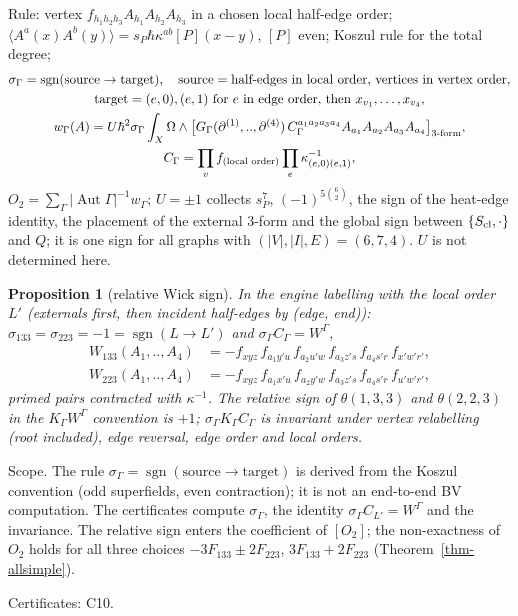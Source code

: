 \documentclass[10pt,a4paper]{article}
\numberwithin{equation}{section}
\newtheorem{proposition}[theorem]{Proposition}
\theoremstyle{definition}
\theoremstyle{remark}
\newcommand{\sgn}{\operatorname{sgn}}
\newcommand{\Aut}{\operatorname{Aut}}
\newcommand{\cert}[1]{\par\noindent\textup{Certificates: #1.}\par}
\begin{document}
Rule: vertex $f_{h_1h_2h_3}A_{h_1}A_{h_2}A_{h_3}$ in a chosen local half-edge order; $\langle A^a(x)A^b(y)\rangle=s_P\hbar\kappa^{ab}[P](x-y)$, $[P]$ even; Koszul rule for the total degree;
\begin{gather}
\sigma_\Gamma=\sgn(\text{source}\to\text{target}),\quad\text{source}=\text{half-edges in local order, vertices in vertex order},\notag\\
\text{target}=(e,0),(e,1)\ \text{for }e\text{ in edge order, then }x_{v_1},\dots,x_{v_4},\notag\\
w_\Gamma(A)=U\hbar^2\sigma_\Gamma\int_X\Omega\wedge\big[G_\Gamma(\partial^{(1)},..,\partial^{(4)})\,C_\Gamma^{a_1a_2a_3a_4}A_{a_1}A_{a_2}A_{a_3}A_{a_4}\big]_{3\text{-form}},\\
C_\Gamma=\prod_vf_{(\text{local order})}\prod_e\kappa^{-1}_{(e,0)(e,1)},
\end{gather}
$O_2=\sum_\Gamma|\Aut\Gamma|^{-1}w_\Gamma$; $U=\pm1$ collects $s_P^7$, $(-1)^{5\binom62}$, the sign of the heat-edge identity, the placement of the external $3$-form and the global sign between $\{S_{\rm cl},\cdot\}$ and $Q$; it is one sign for all graphs with $(|V|,|I|,E)=(6,7,4)$. $U$ is not determined here.

\begin{proposition}[relative Wick sign]\label{prop-wick}
In the engine labelling with the local order $L'$ (externals first, then incident half-edges by (edge, end)): $\sigma_{133}=\sigma_{223}=-1=\sgn(L\to L')$ and $\sigma_\Gamma C_\Gamma=W^\Gamma$,
\begin{align}
W_{133}(A_1,..,A_4)&=-f_{xyz}\,f_{a_1y'u}\,f_{a_2u'w}\,f_{a_3z's}\,f_{a_4s'r}\,f_{x'w'r'},\\
W_{223}(A_1,..,A_4)&=-f_{xyz}\,f_{a_1x'u}\,f_{a_2y'w}\,f_{a_3z's}\,f_{a_4s'r}\,f_{u'w'r'},
\end{align}
primed pairs contracted with $\kappa^{-1}$. The relative sign of $\theta(1,3,3)$ and $\theta(2,2,3)$ in the $K_\Gamma W^\Gamma$ convention is $+1$; $\sigma_\Gamma K_\Gamma C_\Gamma$ is invariant under vertex relabelling (root included), edge reversal, edge order and local orders.
\end{proposition}
Scope. The rule $\sigma_\Gamma=\sgn(\text{source}\to\text{target})$ is derived from the Koszul convention (odd superfields, even contraction); it is not an end-to-end BV computation. The certificates compute $\sigma_\Gamma$, the identity $\sigma_\Gamma C_{L'}=W^\Gamma$ and the invariance. The relative sign enters the coefficient of $[O_2]$; the non-exactness of $O_2$ holds for all three choices $-3F_{133}\pm2F_{223}$, $3F_{133}+2F_{223}$ (Theorem~\ref{thm-allsimple}).
\cert{C10}
\end{document}
